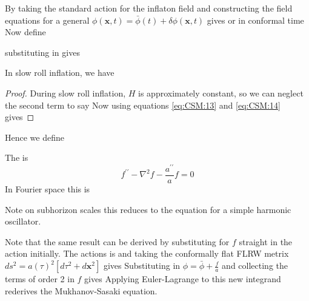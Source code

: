 \documentclass{article}
\begin{document}
By taking the standard action for the inflaton field and constructing the field equations for a general $\phi(\bm{x},t)= \bar{\phi}(t) + \delta \phi(\bm{x},t)$ gives 
or in conformal time 
Now define 

substituting in gives 

\begin{prop}
In slow roll inflation, we have
\end{prop}
\begin{proof}
During slow roll inflation, $H$ is approximately constant, so we can neglect the second term to say  
Now using equations \ref{eq:CSM:13} and \ref{eq:CSM:14} gives 
\end{proof}

Hence we define 

\begin{definition}
The  is 
\[
f ^ { \prime \prime } - \nabla ^ { 2 } f - \frac { a ^ { \prime \prime } } { a } f = 0
\]
In Fourier space this is 
\end{definition}

Note on subhorizon scales this reduces to 
the equation for a simple harmonic oscillator. 

\begin{aside}
Note that the same result can be derived by substituting for $f$ straight in the action initially. The actions is 
and taking the conformally flat FLRW metrix $ds^2 = a(\tau)^2 [d\tau^2 + d\bm{x}^2]$ gives 
Substituting in $\phi = \bar{\phi} + \frac{f}{a}$ and collecting the terms of order 2 in $f$ gives 
Applying Euler-Lagrange to this new integrand rederives the Mukhanov-Sasaki equation. 
\end{aside}
\end{document}
